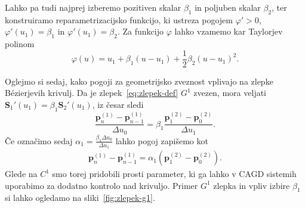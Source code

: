 \documentclass[isrm2, tisk]{fmfdelo}
\newcommand{\p}{\mathbf{p}}
\begin{document}
    Lahko pa tudi najprej izberemo pozitiven skalar $\beta_1$ in poljuben skalar $\beta_2$, ter konstruiramo reparametrizacijsko funkcijo, ki ustreza pogojem $\varphi'>0$,  $\varphi'(u_1)=\beta_1$ in $\varphi'(u_1)=\beta_2$.
    Za funkcijo $\varphi$ lahko vzamemo kar Taylorjev polinom
    \[\varphi(u) = u_1 + \beta_1(u-u_1) + \frac{1}{2}\beta_2(u-u_1)^2.\]

    Oglejmo si sedaj, kako pogoji za geometrijsko zveznost vplivajo na zlepke Bézierjevih krivulj.
    Da je zlepek~\eqref{eq:zlepek-def} $G^1$ zvezen, mora veljati  $\mathbf{S}_1'(u_1) = \beta_1\mathbf{S}_2'(u_1)$, iz česar sledi
    \[\frac{\p_{n}^{(1)} - \p_{n-1}^{(1)}}{\Delta u_0} = \beta_1\frac{\p_{1}^{(2)} - \p_{0}^{(2)}}{\Delta u_1}.\]
    Če označimo sedaj $\alpha_1=  \frac{\beta_1\Delta u_0}{\Delta u_1}$ lahko pogoj zapišemo kot
    \begin{align}
        \p_{n}^{(1)} - \p_{n-1}^{(1)}= \alpha_1(\p_{1}^{(2)} - \p_{0}^{(2)}).\label{eq:g1-pogoj}
    \end{align}
    Glede na $C^1$  smo torej pridobili prosti parameter, ki ga lahko v CAGD sistemih uporabimo za dodatno kontrolo nad krivuljo.
    Primer $G^1$ zlepka in vpliv izbire $\beta_1$ si lahko ogledamo na sliki~\ref{fig:zlepek-g1}.
\end{document}
